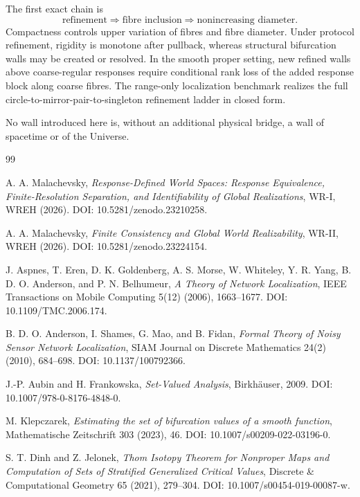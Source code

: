 \documentclass[11pt]{article}
\begin{document}
The first exact chain is
\[
\text{refinement}
\Longrightarrow
\text{fibre inclusion}
\Longrightarrow
\text{nonincreasing diameter}.
\]
Compactness controls upper variation of fibres and fibre diameter. Under
protocol refinement, rigidity is monotone after pullback, whereas structural
bifurcation walls may be created or resolved. In the smooth proper setting,
new refined walls above coarse-regular responses require conditional rank loss
of the added response block along coarse fibres. The range-only localization
benchmark realizes the full circle-to-mirror-pair-to-singleton refinement
ladder in closed form.

No wall introduced here is, without an additional physical bridge, a wall of
spacetime or of the Universe.

\begin{thebibliography}{99}

A. A. Malachevsky,
\emph{Response-Defined World Spaces: Response Equivalence,
Finite-Resolution Separation, and Identifiability of Global Realizations},
WR-I, WREH (2026).
DOI: 10.5281/zenodo.23210258.

A. A. Malachevsky,
\emph{Finite Consistency and Global World Realizability},
WR-II, WREH (2026).
DOI: 10.5281/zenodo.23224154.

J. Aspnes, T. Eren, D. K. Goldenberg, A. S. Morse, W. Whiteley,
Y. R. Yang, B. D. O. Anderson, and P. N. Belhumeur,
\emph{A Theory of Network Localization},
IEEE Transactions on Mobile Computing 5(12) (2006), 1663--1677.
DOI: 10.1109/TMC.2006.174.

B. D. O. Anderson, I. Shames, G. Mao, and B. Fidan,
\emph{Formal Theory of Noisy Sensor Network Localization},
SIAM Journal on Discrete Mathematics 24(2) (2010), 684--698.
DOI: 10.1137/100792366.

J.-P. Aubin and H. Frankowska,
\emph{Set-Valued Analysis},
Birkh\"auser, 2009.
DOI: 10.1007/978-0-8176-4848-0.

M. Klepczarek,
\emph{Estimating the set of bifurcation values of a smooth function},
Mathematische Zeitschrift 303 (2023), 46.
DOI: 10.1007/s00209-022-03196-0.

S. T. Dinh and Z. Jelonek,
\emph{Thom Isotopy Theorem for Nonproper Maps and Computation of Sets of
Stratified Generalized Critical Values},
Discrete \& Computational Geometry 65 (2021), 279--304.
DOI: 10.1007/s00454-019-00087-w.


\end{thebibliography}
\end{document}
